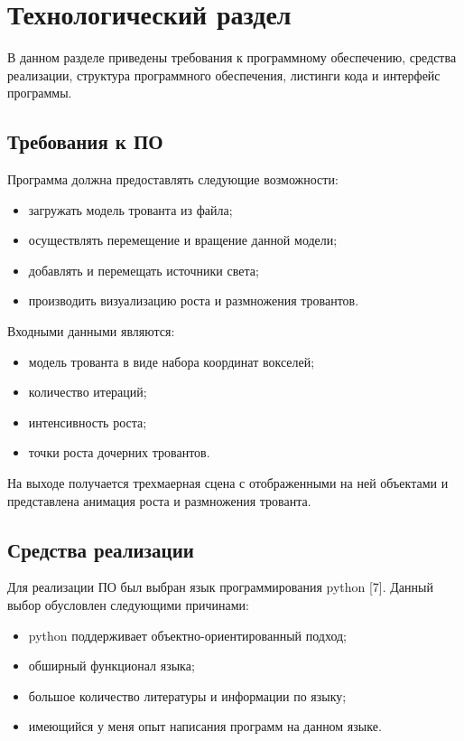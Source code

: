 \chapter{Технологический раздел}

В данном разделе приведены требования к программному обеспечению, средства реализации, структура программного обеспечения, листинги кода и интерфейс программы.

\section{Требования к ПО}
Программа должна предоставлять следующие возможности:
\begin{itemize}
	\item загружать модель трованта из файла;
	\item осуществлять перемещение и вращение данной модели;
	\item добавлять и перемещать источники света;
	\item производить визуализацию роста и размножения тровантов.
\end{itemize}

Входными данными являются:
\begin{itemize}
	\item модель трованта в виде набора координат вокселей;
	\item количество итераций;
	\item интенсивность роста;
	\item точки роста дочерних тровантов.
\end{itemize}

На выходе получается трехмаерная сцена с отображенными на ней объектами и представлена анимация роста и размножения трованта.
\section{Средства реализации}
Для реализации ПО был выбран язык программирования python [7]. Данный выбор обусловлен следующими причинами:
\begin{itemize}
	\item python поддерживает объектно-ориентированный подход;
	\item обширный функционал языка;
	\item большое количество литературы и информации по языку;
	\item имеющийся у меня опыт написания программ на данном языке.
\end{itemize}

